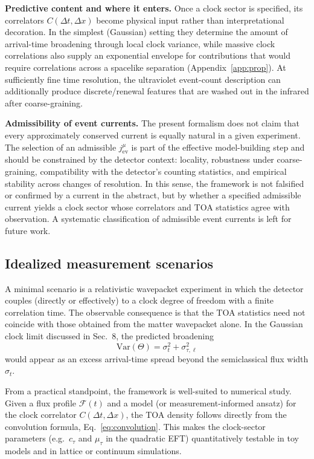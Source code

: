 \documentclass[pdflatex,sn-mathphys-num]{sn-jnl}
\theoremstyle{thmstylethree}
\theoremstyle{thmstyleone}
\theoremstyle{thmstyletwo}
\numberwithin{equation}{section}
\begin{document}
        \medskip
        \noindent
        \textbf{Predictive content and where it enters.}
        Once a clock sector is specified, its correlators $C(\Delta t,\Delta x)$ become physical input rather than interpretational decoration. In the simplest (Gaussian) setting they determine the amount of arrival-time broadening through local clock variance, while massive clock correlations also supply an exponential envelope for contributions that would require correlations across a spacelike separation (Appendix~\ref{app:prop}). At sufficiently fine time resolution, the ultraviolet event-count description can additionally produce discrete/renewal features that are washed out in the infrared after coarse-graining.

        \medskip
        \noindent
        \textbf{Admissibility of event currents.}
        The present formalism does not claim that every approximately conserved current is equally natural in a given experiment. The selection of an admissible $j^\mu_{\mathrm{ev}}$ is part of the effective model-building step and should be constrained by the detector context: locality, robustness under coarse-graining, compatibility with the detector's counting statistics, and empirical stability across changes of resolution. In this sense, the framework is not falsified or confirmed by a current in the abstract, but by whether a specified admissible current yields a clock sector whose correlators and TOA statistics agree with observation. A systematic classification of admissible event currents is left for future work.
    
    \subsection*{Idealized measurement scenarios}
    
    A minimal scenario is a relativistic wavepacket experiment in which the detector couples (directly or effectively) to a clock degree of freedom with a finite correlation time. The observable consequence is that the TOA statistics need not coincide with those obtained from the matter wavepacket alone.     In the Gaussian clock limit discussed in Sec.~8, the predicted broadening
    \begin{equation}
        \mathrm{Var}(\Theta)=\sigma_t^2+\sigma_{\tau,\ell}^2
    \end{equation}
    would appear as an excess arrival-time spread beyond the semiclassical flux width $\sigma_t$.
    
    From a practical standpoint, the framework is well-suited to numerical study. Given a flux profile $\mathcal{F}(t)$ and a model (or measurement-informed ansatz) for the clock correlator $C(\Delta t,\Delta x)$, the TOA density follows directly from the convolution formula, Eq.~\eqref{eq:convolution}. This makes the clock-sector parameters (e.g.\ $c_\tau$ and $\mu_\tau$ in the quadratic EFT) quantitatively testable in toy models and in lattice or continuum simulations.
\end{document}
